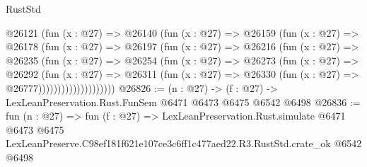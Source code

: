 \begin{lexlean}{RustStd}
\begin{coremodule}
                  @26121
                    (fun (x : @27) =>
                    @26140
                      (fun (x : @27) =>
                      @26159
                        (fun (x : @27) =>
                        @26178
                          (fun (x : @27) =>
                          @26197
                            (fun (x : @27) =>
                            @26216
                              (fun (x : @27) =>
                              @26235
                                (fun (x : @27) =>
                                @26254
                                  (fun (x : @27) =>
                                  @26273
                                    (fun (x : @27) =>
                                    @26292
                                      (fun (x : @27) =>
                                      @26311
                                        (fun (x : @27) =>
                                        @26330 (fun (x : @27) => @26777))))))))))))))))))))
@26826 := (n : @27) -> (f : @27) -> LexLeanPreservation.Rust.FunSem @6471 @6473 @6475 @6542 @6498
@26836 := fun (n : @27) =>
  fun (f : @27) =>
  LexLeanPreservation.Rust.simulate
    @6471
    @6473
    @6475
    LexLeanPreserve.C98ef181f621e107ce3c6ff1c477aed22.R3.RustStd.crate_ok
    @6542
    @6498
\end{coremodule}
\end{lexlean}
